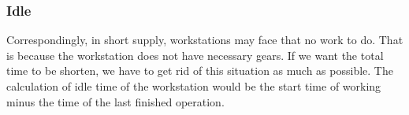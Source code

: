 \documentclass{article}
\begin{document}
\subsubsection{Idle}

Correspondingly, in short supply, workstations may face that no work to do. That is because the workstation does not have necessary gears. If we want the total time to be shorten, we have to get rid of this situation as much as possible. The calculation of idle time of the workstation would be the start time of working minus the time of the last finished operation.
\end{document}
